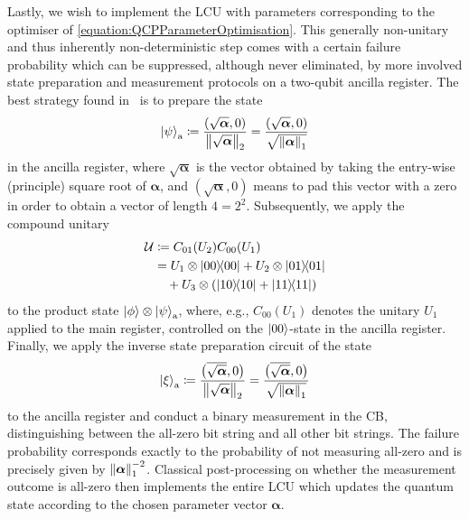 \documentclass[10pt,conference]{IEEEtran}
\DeclareMathOperator{\ancilla}{a}     %
\begin{document}
Lastly, we wish to implement the LCU with parameters corresponding to the optimiser of \eqref{equation:QCPParameterOptimisation}.
This generally non-unitary and thus inherently non-deterministic step comes with a certain failure probability which can be suppressed, although never eliminated, by more involved state preparation and measurement protocols on a two-qubit ancilla register.
The best strategy found in~\cite{Binkowski2025FromBarrenPlateausThroughFertileValleysConicExtensionsOfParameterisedQuantumCircuits} is to prepare the state
\begin{align}\label{equation:StatePreparation}
    \ket{\psi}_{\ancilla} \coloneqq \frac{(\sqrt{\bm{\alpha}}, 0)}{\norm{\sqrt{\bm{\alpha}}}_{2}} = \frac{(\sqrt{\bm{\alpha}}, 0)}{\sqrt{\norm{\bm{\alpha}}_{1}}}
\end{align}
in the ancilla register, where $\sqrt{\bm{\alpha}}$ is the vector obtained by taking the entry-wise (principle) square root of $\bm{\alpha}$, and $(\sqrt{\bm{\alpha}}, 0)$ means to pad this vector with a zero in order to obtain a vector of length $4 = 2^{2}$.
Subsequently, we apply the compound unitary
\begin{align*}
    \mathcal{U} &\coloneqq C_{01}(U_{2}) C_{00}(U_{1}) \\
    &= U_{1} \otimes \ketbra{00}{00} + U_{2} \otimes \ketbra{01}{01} \\
    &\quad + U_{3} \otimes (\ketbra{10}{10} + \ketbra{11}{11})
\end{align*}
to the product state $\ket{\phi} \otimes \ket{\psi}_{\ancilla}$, where, e.g., $C_{00}(U_{1})$ denotes the unitary $U_{1}$ applied to the main register, controlled on the $\ket{00}$-state in the ancilla register.
Finally, we apply the inverse state preparation circuit of the state
\begin{align}\label{equation:InverseStatePreparation}
    \ket{\xi}_{\ancilla} \coloneqq \frac{\big(\overline{\sqrt{\bm{\alpha}}}, 0\big)}{\norm{\sqrt{\bm{\alpha}}}_{2}} = \frac{\big(\overline{\sqrt{\bm{\alpha}}}, 0\big)}{\sqrt{\norm{\bm{\alpha}}_{1}}}
\end{align}
to the ancilla register and conduct a binary measurement in the CB, distinguishing between the all-zero bit string and all other bit strings.
The failure probability corresponds exactly to the probability of not measuring all-zero and is precisely given by $\norm{\bm{\alpha}}_{1}^{-2}$.
Classical post-processing on whether the measurement outcome is all-zero then implements the entire LCU which updates the quantum state according to the chosen parameter vector $\bm{\alpha}$.
\end{document}
